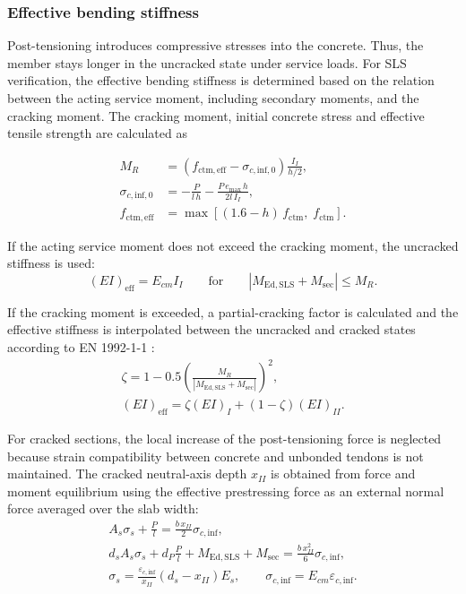 \subsubsection{Effective bending stiffness}

Post-tensioning introduces compressive stresses into the concrete. Thus, the member stays longer in the uncracked state under service loads. For SLS verification, the effective bending stiffness is determined based on the relation between the acting service moment, including secondary moments, and the cracking moment. The cracking moment, initial concrete stress and effective tensile strength are calculated as

\begin{equation}
\begin{aligned}
M_R
&=
\left(
f_{\mathrm{ctm,eff}}
-
\sigma_{c,\mathrm{inf},0}
\right)
\frac{I_I}{h/2},\\
\sigma_{c,\mathrm{inf},0}
&=
-\frac{P}{l\,h}
-
\frac{P\,e_{\max}\,h}{2l\,I_I},\\
f_{\mathrm{ctm,eff}}
&=
\max
\left[
(1.6-h)\,f_{\mathrm{ctm}},
\;
f_{\mathrm{ctm}}
\right].
\end{aligned}
\end{equation}

If the acting service moment does not exceed the cracking moment, the uncracked stiffness is used:
\begin{equation}
(EI)_{\mathrm{eff}}
=
E_{cm}I_I
\qquad
\text{for}
\qquad
\left|M_{\mathrm{Ed,SLS}}+M_{\mathrm{sec}}\right|
\leq
M_R.
\end{equation}

If the cracking moment is exceeded, a partial-cracking factor is calculated and the effective stiffness is interpolated between the uncracked and cracked states according to EN 1992-1-1 \cite{DIN_EN_1992_1_1_2025}:
\begin{equation}
\begin{gathered}
\zeta=
1
-
0.5
\left(
\frac{M_R}{|M_{\mathrm{Ed,SLS}}+M_{\mathrm{sec}}|}
\right)^2,\\[0.5em]
(EI)_{\mathrm{eff}}
=
\zeta (EI)_I
+
(1-\zeta)(EI)_{II}.
\end{gathered}
\end{equation}

For cracked sections, the local increase of the post-tensioning force is neglected because strain compatibility between concrete and unbonded tendons is not maintained. The cracked neutral-axis depth \(x_{II}\) is obtained from force and moment equilibrium using the effective prestressing force as an external normal force averaged over the slab width:
\begin{equation}
\begin{gathered}
A_s\sigma_s + \frac{P}{l}
=
\frac{b\,x_{II}}{2}\sigma_{c,\mathrm{inf}},
\\[0.5em]
d_sA_s\sigma_s
+
d_P\frac{P}{l}
+
M_{\mathrm{Ed,SLS}}
+
M_{\mathrm{sec}}
=
\frac{b\,x_{II}^2}{6}\sigma_{c,\mathrm{inf}},
\\[0.5em]
\sigma_s
=
\frac{\varepsilon_{c,\mathrm{inf}}}{x_{II}}
(d_s-x_{II})E_s,
\qquad
\sigma_{c,\mathrm{inf}}
=
E_{cm}\varepsilon_{c,\mathrm{inf}}.
\end{gathered}
\end{equation}

